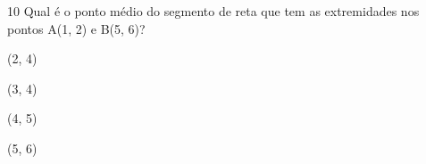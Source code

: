 


\num{10} Qual é o ponto médio do segmento de reta que tem as extremidades nos
pontos A(1, 2) e B(5, 6)?
\item (2, 4)
\item (3, 4)
\item (4, 5)
\item (5, 6)







